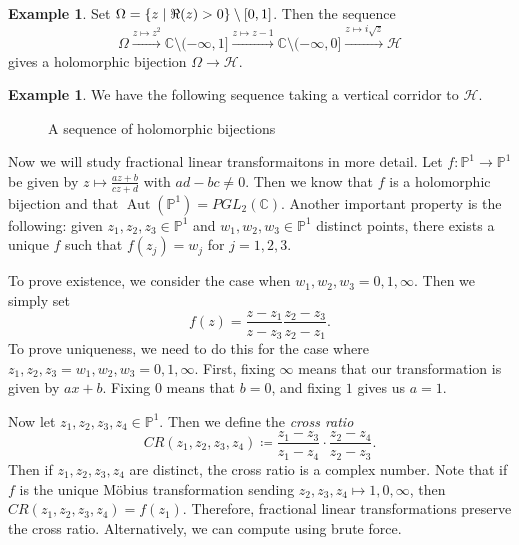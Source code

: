 \documentclass[leqno, openany]{memoir}
\theoremstyle{definition}
\newtheorem{exm}[thm]{Example}
\theoremstyle{remark}
\theoremstyle{plain}
\theoremstyle{definition}
\theoremstyle{remark}
\newcommand{\C}{\mathbb{C}}
\renewcommand{\P}{\mathbb{P}}
\newcommand{\mc}[1]{\mathcal{#1}}
\DeclareMathOperator{\Aut}{Aut}
\begin{document}
\begin{exm}
    Set $\Omega = \qty{z \mid \real (z) > 0} \setminus [0,1]$. Then the sequence
    \[ \Omega \xrightarrow{z \mapsto z^2} \C \setminus (-\infty, 1] \xrightarrow{z \mapsto z-1} \C \setminus (-\infty, 0] \xrightarrow{z \mapsto i\sqrt{z}} \mc{H} \]
    gives a holomorphic bijection $\Omega \to \mc{H}$.
\end{exm}

\begin{exm}
    We have the following sequence taking a vertical corridor to $\mc{H}$.
    \begin{figure}[H]
    \begin{center}
    \end{center}
    \caption{A sequence of holomorphic bijections}%
    \label{fig:sequence-holomorphic-bijections}
    \end{figure}
\end{exm}

Now we will study fractional linear transformaitons in more detail. Let $f \colon \P^1 \to \P^1$ be given by $z \mapsto \frac{az+b}{cz+d}$ with $ad-bc \neq 0$. Then we know that $f$ is a holomorphic bijection and that $\Aut(\P^1) = PGL_2(\C)$. Another important property is the following: given $z_1, z_2, z_3 \in \P^1$ and $w_1, w_2, w_3 \in \P^1$ distinct points, there exists a unique $f$ such that $f(z_j) = w_j$ for $j = 1,2,3$.

To prove existence, we consider the case when $w_1, w_2, w_3 = 0,1,\infty$. Then we simply set 
\[ f(z) = \frac{z - z_1}{z-z_3} \frac{z_2 - z_3}{z_2 - z_1}. \]
To prove uniqueness, we need to do this for the case where $z_1,z_2,z_3 = w_1,w_2,w_3 = 0,1,\infty$. First, fixing $\infty$ means that our transformation is given by $ax + b$. Fixing $0$ means that $b = 0$, and fixing $1$ gives us $a = 1$.

Now let $z_1, z_2, z_3, z_4 \in \P^1$. Then we define the \textit{cross ratio}
\[ CR(z_1, z_2, z_3, z_4) \coloneqq \frac{z_1 - z_3}{z_1 - z_4} \cdot \frac{z_2 - z_4}{z_2 - z_3}. \]
Then if $z_1, z_2, z_3, z_4$ are distinct, the cross ratio is a complex number. Note that if $f$ is the unique M\"obius transformation sending $z_2, z_3, z_4 \mapsto 1,0, \infty$, then $CR(z_1, z_2, z_3, z_4) = f(z_1)$. Therefore, fractional linear transformations preserve the cross ratio. Alternatively, we can compute using brute force.
\end{document}
